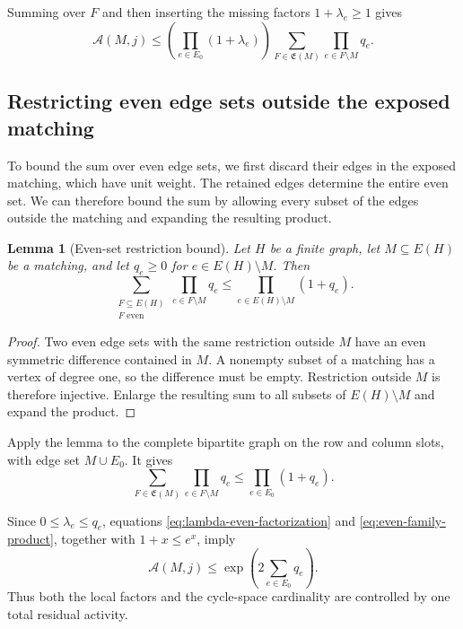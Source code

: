 \documentclass[a4paper,10pt,reqno]{amsart}
\numberwithin{equation}{section}
\theoremstyle{plain}
\newtheorem{lemma}[theorem]{Lemma}
\theoremstyle{remark}
\begin{document}
Summing over $F$ and then inserting the missing factors
$1+\lambda_e\ge1$ gives
\begin{equation}
  \mathcal A(M,j)
  \le
  \left(\prod_{e\in E_0}(1+\lambda_e)\right)
  \sum_{F\in\mathfrak E(M)}
    \prod_{e\in F\setminus M}q_e.
  \label{eq:lambda-even-factorization}
\end{equation}

\subsection{Restricting even edge sets outside the exposed matching}

To bound the sum over even edge sets, we first discard their edges in the
exposed matching, which have unit weight. The retained edges determine
the entire even set. We can therefore bound the sum by allowing every
subset of the edges outside the matching and expanding the resulting
product.

\begin{lemma}[Even-set restriction bound]
\label{lem:restriction-product}
Let \(H\) be a finite graph, let \(M\subseteq E(H)\) be a matching, and
let \(q_e\ge0\) for \(e\in E(H)\setminus M\). Then
\[
 \sum_{\substack{F\subseteq E(H)\\F\text{ even}}}
   \prod_{e\in F\setminus M}q_e
 \le\prod_{e\in E(H)\setminus M}(1+q_e).
\]
\end{lemma}

\begin{proof}
Two even edge sets with the same restriction outside \(M\) have an even
symmetric difference contained in \(M\). A nonempty subset of a matching
has a vertex of degree one, so the difference must be empty.
Restriction outside \(M\) is therefore injective. Enlarge the resulting
sum to all subsets of \(E(H)\setminus M\) and expand the product.
\end{proof}

Apply the lemma to the complete bipartite graph on the row and column slots, with edge set \(M\cup E_0\). It gives
\begin{equation}
  \sum_{F\in\mathfrak E(M)}\prod_{e\in F\setminus M}q_e
  \le\prod_{e\in E_0}(1+q_e).
  \label{eq:even-family-product}
\end{equation}

Since $0\le\lambda_e\le q_e$, equations
\eqref{eq:lambda-even-factorization} and
\eqref{eq:even-family-product}, together with $1+x\le e^x$, imply
\begin{equation}
  \mathcal A(M,j)
  \le
  \exp\!\left(2\sum_{e\in E_0}q_e\right).
  \label{eq:q-only-attachment}
\end{equation}
Thus both the local factors and the cycle-space cardinality are controlled by
one total residual activity.
\end{document}

